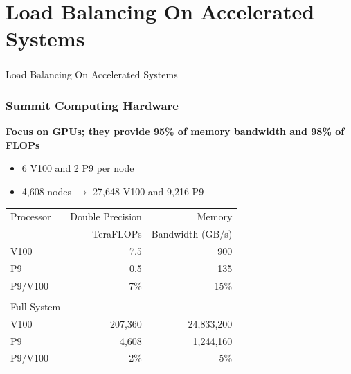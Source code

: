 \documentclass[aspectratio=169]{beamer}
\begin{document}
\section{Load Balancing On Accelerated Systems}

\begin{frame}
  \frametitle{}
  \center \huge{Load Balancing On Accelerated Systems}
\end{frame}

\begin{frame}
  \frametitle{Summit Computing Hardware}
  \textbf{Focus on GPUs; they provide 95\% of memory bandwidth and 98\% of FLOPs}
  \begin{itemize}
    \item 6 V100 and 2 P9 per node
    \item 4,608 nodes $\rightarrow$ 27,648 V100 and 9,216 P9
  \end{itemize}
  {
  \begin{table}[]
    \begin{tabular}{lrr}
      Processor   & Double Precision & Memory           \\
                  & TeraFLOPs        & Bandwidth (GB/s) \\
      V100        & 7.5              & 900              \\
      P9          & 0.5              & 135       \\
      P9/V100     & 7\%              & 15\% \\
      \\
      Full System &                  & \\
      V100        & 207,360          & 24,833,200       \\
      P9          & 4,608            & 1,244,160       \\
      P9/V100     & 2\%              & 5\%
    \end{tabular}
  \end{table}
  }
\end{frame}
\end{document}
